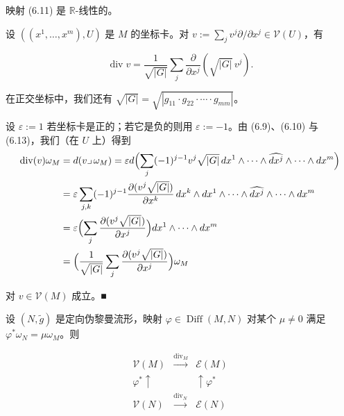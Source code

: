 \begin{remark}

\begin{items}
\item

映射 (6.11) 是 $ \mathbb{R} $-线性的。

\item

设 $ ((x^1,\ldots,x^m),U) $ 是 $ M $ 的坐标卡。对 $ v := \sum_j v^j\partial/\partial x^j \in \mathcal{V}(U) $，有

\begin{equation}
\operatorname{div} v = \frac{1}{\sqrt{|G|}}\sum_{j}\frac{\partial}{\partial x^{j}}\left(\sqrt{|G|}\,v^{j}\right).\tag{6.14}
\end{equation}

在正交坐标中，我们还有 $ \sqrt{|G|} = \sqrt{|g_{11}\cdot g_{22}\cdot\cdots\cdot g_{mm}|} $。

\proofhead
设 $ \varepsilon := 1 $ 若坐标卡是正的；若它是负的则用 $ \varepsilon := -1 $。由 (6.9)、(6.10) 与 (6.13)，我们（在 $ U $ 上）得到
\begin{equation*}
\begin{aligned}
\operatorname{div}(v)\omega_{M} &= d(v\lrcorner\,\omega_{M}) = \varepsilon d\Bigl(\sum_{j}(-1)^{j-1}v^{j}\sqrt{|G|}\,dx^{1}\wedge\cdots\wedge\widehat{dx^{j}}\wedge\cdots\wedge dx^{m}\Bigr) \\ &= \varepsilon\sum_{j,k}(-1)^{j-1}\frac{\partial(v^{j}\sqrt{|G|})}{\partial x^{k}}\,dx^{k}\wedge dx^{1}\wedge\cdots\wedge\widehat{dx^{j}}\wedge\cdots\wedge dx^{m} \\ &= \varepsilon\Bigl(\sum_{j}\frac{\partial(v^{j}\sqrt{|G|})}{\partial x^{j}}\Bigr)dx^{1}\wedge\cdots\wedge dx^{m} \\ &= \Bigl(\frac{1}{\sqrt{|G|}}\sum_{j}\frac{\partial(v^{j}\sqrt{|G|})}{\partial x^{j}}\Bigr)\omega_{M}
\end{aligned}
\end{equation*}

对 $ v \in \mathcal{V}(M) $ 成立。\nobreak\hspace{0.35em}■

\item

设 $ (N,\tilde{g}) $ 是定向伪黎曼流形，映射 $ \varphi \in \operatorname{Diff}(M,N) $ 对某个 $ \mu \ne 0 $ 满足 $ \varphi^{*}\omega_N = \mu\omega_M $。则

\begin{equation*}
\begin{array}{ccc} \mathcal{V}(M) & \xrightarrow{\operatorname{div}_{M}} & \mathcal{E}(M) \\ \varphi^{*}\uparrow & & \uparrow\varphi^{*} \\ \mathcal{V}(N) & \xrightarrow{\operatorname{div}_{N}} & \mathcal{E}(N) \end{array}
\end{equation*}


\end{items}
\end{remark}
